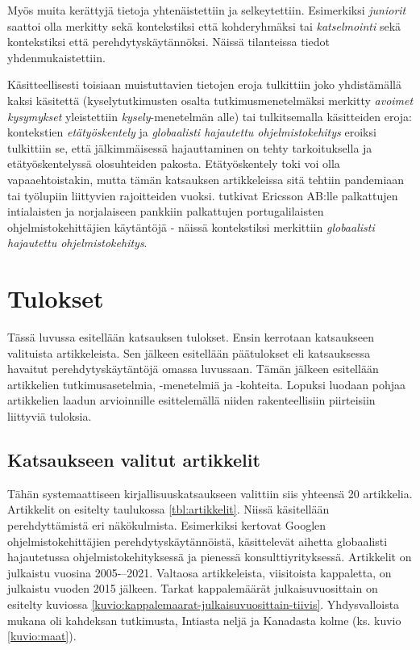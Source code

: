 \documentclass[utf8]{gradu3}
\begin{document}
Myös muita kerättyjä tietoja yhtenäistettiin ja selkeytettiin. Esimerkiksi \textit{juniorit} saattoi olla merkitty sekä kontekstiksi että kohderyhmäksi tai \textit{katselmointi} sekä kontekstiksi että perehdytyskäytännöksi. Näissä tilanteissa tiedot yhdenmukaistettiin.

Käsitteellisesti toisiaan muistuttavien tietojen eroja tulkittiin joko yhdistämällä kaksi käsitettä (kyselytutkimusten osalta tutkimusmenetelmäksi merkitty \textit{avoimet kysymykset} yleistettiin \textit{kysely}-menetelmän alle) tai tulkitsemalla käsitteiden eroja: kontekstien \textit{etätyöskentely} ja \textit{globaalisti hajautettu ohjelmistokehitys} eroiksi tulkittiin se, että jälkimmäisessä hajauttaminen on tehty tarkoituksella ja etätyöskentelyssä olosuhteiden pakosta. Etätyöskentely toki voi olla vapaaehtoistakin, mutta tämän katsauksen artikkeleissa sitä tehtiin pandemiaan \parencite{rodeghero-ym-2021} tai työlupiin \parencite{hemphill-begel-2011} liittyvien rajoitteiden vuoksi. \textcite{britto-ym-2020} tutkivat Ericsson AB:lle palkattujen intialaisten ja \textcite{moe-ym-2020} norjalaiseen pankkiin palkattujen portugalilaisten ohjelmistokehittäjien käytäntöjä - näissä kontekstiksi merkittiin \textit{globaalisti hajautettu ohjelmistokehitys}.

\chapter{Tulokset}
\label{paaluku-tulokset}

Tässä luvussa esitellään katsauksen tulokset. Ensin kerrotaan katsaukseen valituista artikkeleista. Sen jälkeen esitellään päätulokset eli katsauksessa havaitut perehdytyskäytäntöjä omassa luvussaan. Tämän jälkeen esitellään artikkelien tutkimusasetelmia, -menetelmiä ja -kohteita. Lopuksi luodaan pohjaa artikkelien laadun arvioinnille esittelemällä niiden rakenteellisiin piirteisiin liittyviä tuloksia.

\section{Katsaukseen valitut artikkelit}

Tähän systemaattiseen kirjallisuuskatsaukseen valittiin siis yhteensä 20 artikkelia. Artikkelit on esitelty taulukossa \ref{tbl:artikkelit}. Niissä käsitellään perehdyttämistä eri näkökulmista. Esimerkiksi \textcite{johnson-senges-2010} kertovat Googlen ohjelmistokehittäjien perehdytyskäytännöistä, \textcite{britto-ym-2020} käsittelevät aihetta globaalisti hajautetussa ohjelmistokehityksessä ja \textcite{bjornson-dingsøyr-2005} pienessä konsulttiyrityksessä. Artikkelit on julkaistu vuosina 2005-–2021. Valtaosa artikkeleista, viisitoista kappaletta, on julkaistu vuoden 2015 jälkeen. Tarkat kappalemäärät julkaisuvuosittain on esitelty kuviossa \ref{kuvio:kappalemaarat-julkaisuvuosittain-tiivis}. Yhdysvalloista mukana oli kahdeksan tutkimusta, Intiasta neljä ja Kanadasta kolme (ks. kuvio \ref{kuvio:maat}).
\end{document}
